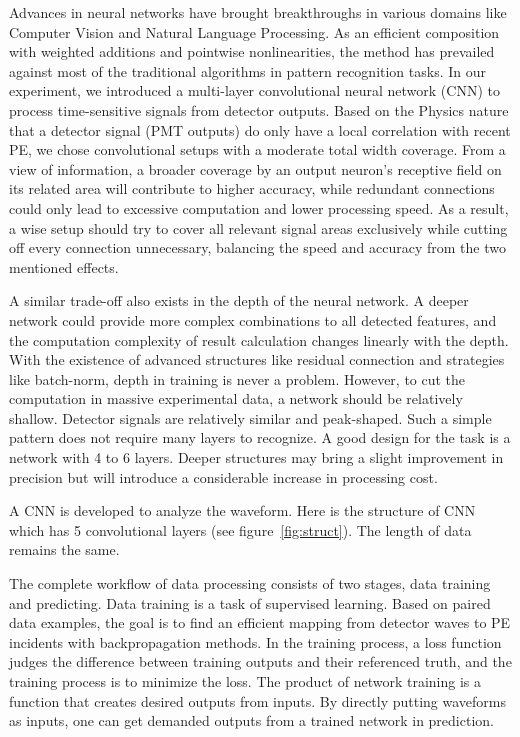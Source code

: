 Advances in neural networks have brought breakthroughs in various domains like Computer Vision and Natural Language Processing. As an efficient composition with weighted additions and pointwise nonlinearities, the method has prevailed against most of the traditional algorithms in pattern recognition tasks. In our experiment, we introduced a multi-layer convolutional neural network (CNN) to process time-sensitive signals from detector outputs. Based on the Physics nature that a detector signal (PMT outputs) do only have a local correlation with recent PE, we chose convolutional setups with a moderate total width coverage. From a view of information, a broader coverage by an output neuron's receptive field on its related area will contribute to higher accuracy, while redundant connections could only lead to excessive computation and lower processing speed. As a result, a wise setup should try to cover all relevant signal areas exclusively while cutting off every connection unnecessary, balancing the speed and accuracy from the two mentioned effects.

A similar trade-off also exists in the depth of the neural network. A deeper network could provide more complex combinations to all detected features, and the computation complexity of result calculation changes linearly with the depth. With the existence of advanced structures like residual connection and strategies like batch-norm, depth in training is never a problem. However, to cut the computation in massive experimental data, a network should be relatively shallow. Detector signals are relatively similar and peak-shaped. Such a simple pattern does not require many layers to recognize. A good design for the task is a network with 4 to 6 layers. Deeper structures may bring a slight improvement in precision but will introduce a considerable increase in processing cost.

A CNN is developed to analyze the waveform. Here is the structure of CNN which has 5 convolutional layers (see figure~\ref{fig:struct}). The length of data remains the same. 


The complete workflow of data processing consists of two stages, data training and predicting. Data training is a task of supervised learning.  Based on paired data examples, the goal is to find an efficient mapping from detector waves to PE incidents with backpropagation methods. In the training process, a loss function judges the difference between training outputs and their referenced truth, and the training process is to minimize the loss. The product of network training is a function that creates desired outputs from inputs. By directly putting waveforms as inputs, one can get demanded outputs from a trained network in prediction.

